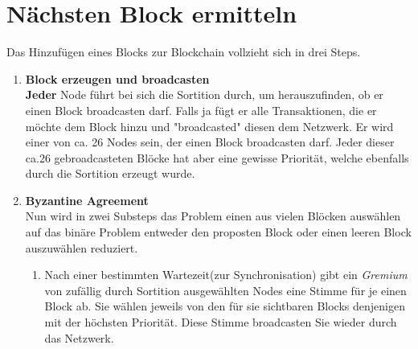 \documentclass[11pt,a4paper]{article}
\begin{document}
\newpage
\section*{N\"achsten Block ermitteln}
Das Hinzuf\"ugen eines Blocks zur Blockchain vollzieht sich in drei Steps.
\begin{enumerate}[label=\arabic*)]
	\item \textbf{Block erzeugen und broadcasten}\\
	\textbf{Jeder} Node f\"uhrt bei sich die Sortition durch, um herauszufinden, ob er einen Block broadcasten darf. 
Falls ja f\"ugt er alle Transaktionen, die er m\"ochte dem Block hinzu und "broadcasted" diesen dem Netzwerk. 
Er wird einer von ca. 26 Nodes sein, der einen Block broadcasten darf. 
Jeder dieser ca.26 gebroadcasteten Bl\"ocke hat aber eine gewisse Priorit\"at, welche ebenfalls durch die Sortition erzeugt wurde.
	 
	\item \textbf{Byzantine Agreement}\\
	Nun wird in zwei Substeps das Problem \grqq{}einen aus vielen Bl\"ocken ausw\"ahlen\grqq{} auf das bin\"are Problem \grqq{}entweder den proposten Block oder einen leeren Block auszuw\"ahlen\grqq{} reduziert.
	\begin{enumerate}[label=\Roman*)]
		\item Nach einer bestimmten Wartezeit(zur Synchronisation) gibt ein \textit{Gremium} von zuf\"allig durch Sortition ausgew\"ahlten Nodes eine Stimme f\"ur je einen Block ab. Sie w\"ahlen jeweils von den f\"ur sie sichtbaren Blocks denjenigen mit der h\"ochsten Priorit\"at. Diese Stimme broadcasten Sie wieder durch das Netzwerk.
		

\end{enumerate}
\end{enumerate}
\end{document}
